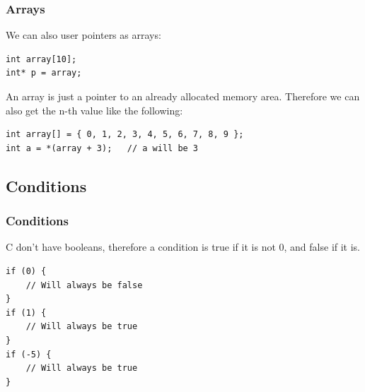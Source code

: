 \documentclass[
	11pt, %
]{beamer}
\begin{document}
\begin{frame}[fragile]
	\frametitle{Arrays}

    We can also user pointers as arrays:

    \begin{lstlisting}[style=CStyle]
int array[10];
int* p = array;

\end{lstlisting}

    \bigskip

    An array is just a pointer to an already allocated memory area. Therefore we can also get the n-th value like the following:

    \begin{lstlisting}[style=CStyle]
int array[] = { 0, 1, 2, 3, 4, 5, 6, 7, 8, 9 };
int a = *(array + 3);   // a will be 3

\end{lstlisting}

\end{frame}

\begin{frame}[fragile]
    \subsection{Conditions}
	\frametitle{Conditions}

    C don't have booleans, therefore a condition is true if it is not 0, and false if it is.

    \bigskip

    \begin{lstlisting}[style=CStyle]
if (0) {
    // Will always be false
}
if (1) {
    // Will always be true
}
if (-5) {
    // Will always be true
}

\end{lstlisting}

\end{frame}
\end{document}
